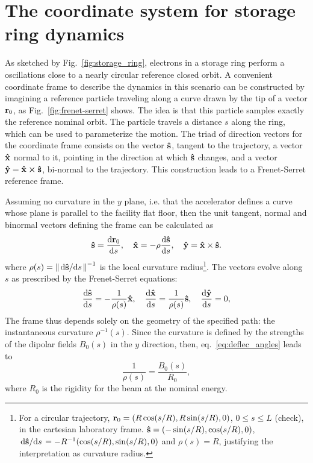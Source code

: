 \section{The coordinate system for storage ring dynamics}
As sketched by Fig.~\ref{fig:storage_ring}, electrons in a storage ring perform a oscillations close to a nearly circular reference closed orbit. A convenient coordinate frame to describe the dynamics in this scenario can be constructed by imagining a reference particle traveling along a curve drawn by the tip of a vector $\vb{r}_0$, as Fig.~\ref{fig:frenet-serret} shows. The idea is that this particle samples exactly the reference nominal orbit. The particle travels a distance $s$ along the ring, which can be used to parameterize the motion. The triad of direction vectors for the coordinate frame consists on the vector $\vu{s}$, tangent to the trajectory, a vector $\vu{x}$ normal to it, pointing in the direction at which $\vu{s}$ changes, and a vector $\vu{y}=\vu{x}\cross\vu{s}$, bi-normal to the trajectory. This construction leads to a Frenet-Serret reference frame.

Assuming no curvature in the $y$ plane, i.e. that the accelerator defines a curve whose plane is parallel to the facility flat floor, then the unit tangent, normal and binormal vectors defining the frame can be calculated as \cite{lee_accelerator_2004}
\begin{equation}
\vu{s}=\dv{\vb{r}_{0}}{s}, \quad \vu{x}=-\rho\dv{\vu{s}}{s}, \quad \vu{y} =  \vu{x}\times\vu{s}.
\end{equation}
where $\rho(s) = \norm{\dv*{\vu{s}}{s}}^{-1}$ is the local curvature radius\footnote{For a circular trajectory, $\vb{r}_0 = (R\cos(s/R), R\sin(s/R), 0)$, $ 0\leq s \leq L$ (check), in the cartesian laboratory frame. $\vu{s}=(-\sin(s/R), \cos(s/R), 0)$, $\dv*{\vu{s}}{s} = -R^{-1}(\cos(s/R),\sin(s/R), 0 )$ and $\rho(s)=R$, justifying the interpretation as curvature radius.}. The vectors evolve along $s$ as prescribed by the Frenet-Serret equations:
\begin{equation}
\dv{\vu{s}}{s}=-\frac{1}{\rho(s)}\vu{x}, \quad\dv{\vu{x}}{s}=\frac{1}{\rho(s)}\vu{s}, \quad \dv{\vu{y}}{s}=0,
\end{equation}
The frame thus depends solely on the geometry of the specified path: the instantaneous curvature $\rho^{-1}(s)$. Since the curvature is defined by the strengths of the dipolar fields $B_0(s)$ in the $y$ direction, then, eq.~\eqref{eq:deflec_angles} leads to
    \begin{equation}
        \frac{1}{\rho(s)} = \frac{B_0(s)}{R_0},
        \label{eq:G}
    \end{equation}
where $R_0$ is the rigidity for the beam at the nominal energy.

